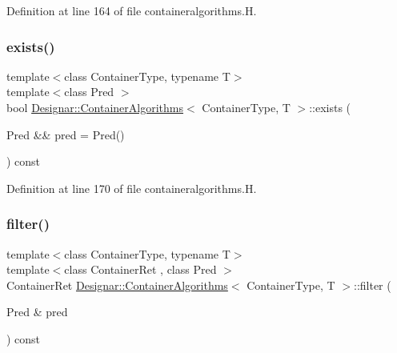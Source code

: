 Definition at line 164 of file containeralgorithms.\+H.

\mbox{\label{class_designar_1_1_container_algorithms_a12f255f04ad0c63d58957f2869caff93}} 
\subsubsection{\texorpdfstring{exists()}{exists()}\hspace{0.1cm}{\footnotesize\ttfamily [2/2]}}
{\footnotesize\ttfamily template$<$class Container\+Type, typename T$>$ \\
template$<$class Pred $>$ \\
bool \hyperlink{class_designar_1_1_container_algorithms}{Designar\+::\+Container\+Algorithms}$<$ Container\+Type, T $>$\+::exists (\begin{DoxyParamCaption}\item[{Pred \&\&}]{pred = {\ttfamily Pred()} }\end{DoxyParamCaption}) const\hspace{0.3cm}{\ttfamily [inline]}}



Definition at line 170 of file containeralgorithms.\+H.

\mbox{\label{class_designar_1_1_container_algorithms_a8fde0ef12e4287386eccf48c381b7fca}} 
\subsubsection{\texorpdfstring{filter()}{filter()}\hspace{0.1cm}{\footnotesize\ttfamily [1/2]}}
{\footnotesize\ttfamily template$<$class Container\+Type, typename T$>$ \\
template$<$class Container\+Ret , class Pred $>$ \\
Container\+Ret \hyperlink{class_designar_1_1_container_algorithms}{Designar\+::\+Container\+Algorithms}$<$ Container\+Type, T $>$\+::filter (\begin{DoxyParamCaption}\item[{Pred \&}]{pred }\end{DoxyParamCaption}) const\hspace{0.3cm}{\ttfamily [inline]}}



